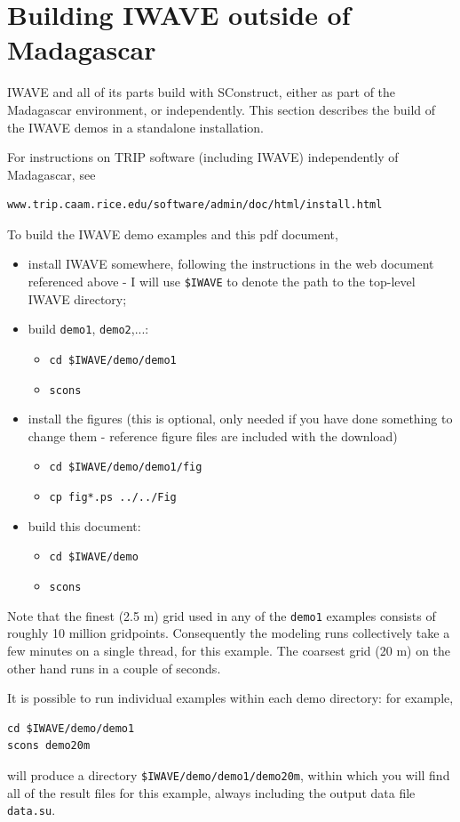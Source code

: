 \documentclass [12pt]{georeport}
\begin{document}
\section{Building IWAVE outside of Madagascar}
IWAVE and all of its parts build with SConstruct, either as part of the Madagascar environment, or independently. This section describes the build of the IWAVE demos in a standalone installation. 

For instructions on TRIP software (including IWAVE) independently of Madagascar, see 
\begin{verbatim}
www.trip.caam.rice.edu/software/admin/doc/html/install.html
\end{verbatim}

To build the IWAVE demo examples and this pdf document,
\begin{itemize}
\item install IWAVE somewhere, following the instructions in the web document referenced above - I will use  {\tt \$IWAVE} to denote
  the path to the top-level IWAVE directory;  
\item build {\tt demo1}, {\tt demo2},...:
\begin{itemize}
\item {\tt cd \$IWAVE/demo/demo1}
\item {\tt scons}
\end{itemize}
\item install the figures (this is optional, only needed if you have done something to change them - reference figure files are included with the download)
\begin{itemize}
\item {\tt cd \$IWAVE/demo/demo1/fig}
\item {\tt cp fig*.ps ../../Fig}
\end{itemize}
\item build this document:
\begin{itemize}
\item {\tt cd \$IWAVE/demo}
\item {\tt scons}
\end{itemize}
\end{itemize}
Note that the finest (2.5 m) grid used in any of the {\tt demo1} examples consists of roughly 10 million
gridpoints. Consequently the modeling runs collectively take a few
minutes on a single thread, for this example. The coarsest grid (20 m) on the other hand runs in a couple of seconds. 

It is possible to run individual examples within each demo directory: for example,
\begin{verbatim}
cd $IWAVE/demo/demo1
scons demo20m
\end{verbatim}
will produce a directory {\tt \$IWAVE/demo/demo1/demo20m}, within which you will 
find all of the result files for this example, always including the output data file {\tt data.su}.
\end{document}
